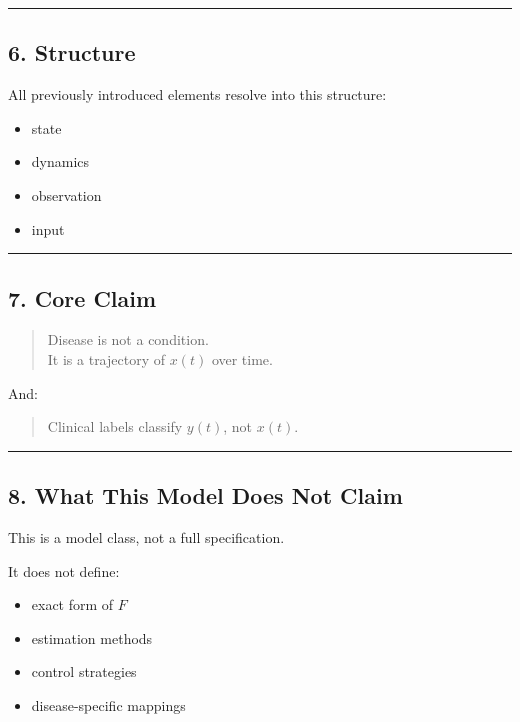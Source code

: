 \documentclass[
  letterpaper,
  DIV=11,
  numbers=noendperiod]{scrartcl}
\providecommand{\tightlist}{%
  \setlength{\itemsep}{0pt}\setlength{\parskip}{0pt}}
\begin{document}
\begin{center}\rule{0.5\linewidth}{0.5pt}\end{center}

\subsection{6. Structure}\label{structure}

All previously introduced elements resolve into this structure:

\begin{itemize}
\tightlist
\item
  state\\
\item
  dynamics\\
\item
  observation\\
\item
  input
\end{itemize}

\begin{center}\rule{0.5\linewidth}{0.5pt}\end{center}

\subsection{7. Core Claim}\label{core-claim}

\begin{quote}
Disease is not a condition.\\
It is a trajectory of \(x(t)\) over time.
\end{quote}

And:

\begin{quote}
Clinical labels classify \(y(t)\), not \(x(t)\).
\end{quote}

\begin{center}\rule{0.5\linewidth}{0.5pt}\end{center}

\subsection{8. What This Model Does Not
Claim}\label{what-this-model-does-not-claim}

This is a model class, not a full specification.

It does not define:

\begin{itemize}
\tightlist
\item
  exact form of \(F\)\\
\item
  estimation methods\\
\item
  control strategies\\
\item
  disease-specific mappings
\end{itemize}
\end{document}
